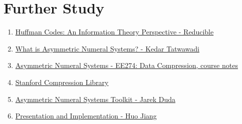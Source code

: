 \section{Further Study}
\begin{frame}{}
    \begin{enumerate}
        \item \href{https://www.youtube.com/watch?v=B3y0RsVCyrw}{Huffman Codes: An Information Theory Perspective - Reducible}
        \item \href{https://kedartatwawadi.github.io/post--ANS/}{What is Asymmetric Numeral Systems? - Kedar Tatwawadi}
        \item \href{https://stanforddatacompressionclass.github.io/notes/lossless_iid/ans.html}{Asymmetric Numeral Systems - EE274: Data Compression, course notes}
        \item \href{https://github.com/kedartatwawadi/stanford_compression_library}{Stanford Compression Library}
        \item \href{https://github.com/JarekDuda/AsymmetricNumeralSystemsToolkit?tab=readme-ov-file}{Asymmetric Numeral Systems Toolkit - Jarek Duda}
        \item \href{https://github.com/hurryclear/cs_theory/tree/data_compression/24ws_data_compression}{Presentation and Implementation - Huo Jiang}
    \end{enumerate}
\end{frame}